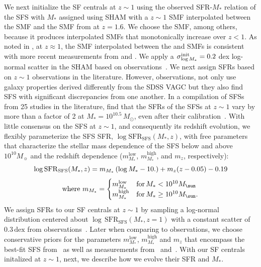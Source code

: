 \documentclass[12pt, letterpaper, preprint, tighten]{aastex62}
\newcommand{\edt}[1]{{\color{dred}{\bf} #1}}
\newcommand{\beq}{\begin{equation}}
\newcommand{\eeq}{\end{equation}}
\newcommand{\logsfr}{\log\mathrm{SFR}}
\newcommand{\siglogm}{\sigma_{\log M_*}}
\begin{document}
We next initialize the SF centrals at $z\sim1$ using the observed SFR-$M_*$
relation of the SFS with $M_*$ assigned using SHAM with a $z\sim1$ SMF
interpolated between the \cite{li2009} SMF and the SMF from \cite{marchesini2009}
at $z = 1.6$. We choose the \cite{marchesini2009} SMF, among others, because it
produces interpolated SMFs that monotonically increase over $z < 1$. As noted
in \cite{hahn2017b}, at $z \approx 1$, the SMF interpolated between the
\cite{li2009} and \cite{marchesini2009} SMFs is consistent with more recent
measurements from \cite{muzzin2013} and \cite{ilbert2013}. We apply a
$\siglogm^{\rm init} = 0.2$ dex log-normal scatter in the SHAM based on 
observations~\citep[\emph{e.g.}][]{leauthaud2012, tinker2013, patel2015}.
We next assign SFRs based on $z \sim 1$ observations in the literature.
However, observations, not only use galaxy properties derived differently
from the SDSS VAGC but they also find SFS with significant discrepancies
from one another. 
\edt{In a compilation of SFSs from 25 studies in the literature, \cite{speagle2014}
find that the SFRs of the SFSs at $z\sim1$ vary by more than a factor of 2 at 
$M_* = 10^{10.5}\, M_\odot$, even after their calibration~\citep[see Figure 2 of][]{speagle2014}.}
With little consensus on the SFS at $z\sim1$, and consequently its redshift
evolution, we flexibly parameterize the SFS SFR,
$\log\mathrm{SFR}_\mathrm{SFS}(M_*, z)$,
\edt{with free parameters that characterize the stellar mass dependence of the SFS
below and above $10^{10} M_\sun$ and the redshift dependence ($m^\mathrm{low}_{M_*}$, 
$m^\mathrm{high}_{M_*}$, and $m_z$, respectively):}
\beq \label{eq:logsfr_ms}
\logsfr_{\rm SFS}(M_*, z) =  m_{M_*}\,(\log M_* - 10.) + m_z (z - 0.05) - 0.19
\eeq
\begin{equation*}
{\rm where}~m_{M_*} = \begin{cases}
m^\mathrm{low}_{M_*} & \text{for}\,M_* < 10^{10}M_\sun \\
m^\mathrm{high}_{M_*} & \text{for}\,M_* \geq 10^{10}M_\sun.
\end{cases}
\end{equation*}
We assign SFRs to our SF centrals at $z\sim1$ by sampling a log-normal
distribution centered about $\log\,\mathrm{SFR}_\mathrm{SFS}(M_*, z=1)$
with a constant scatter of $0.3\,\mathrm{dex}$ from observations~\citep{daddi2007, noeske2007, magdis2012, whitaker2012}.
Later when comparing to observations, we choose conservative priors
for the parameters $m^\mathrm{low}_{M_*}$, $m^\mathrm{high}_{M_*}$ and $m_z$
that encompass the best-fit SFS from~\cite{speagle2014} as well as measurements
from~\cite{moustakas2013} and~\cite{lee2015}. With our SF centrals initalized
at $z \sim 1$, next, we describe how we evolve their SFR and $M_*$.
\end{document}
